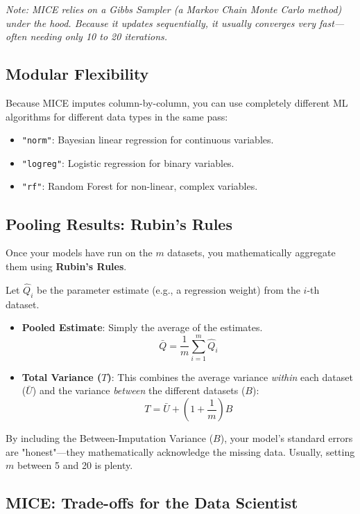 \documentclass[11pt]{article}
\theoremstyle{smallexample}
\begin{document}
\textit{Note: MICE relies on a Gibbs Sampler (a Markov Chain Monte Carlo method) under the hood. Because it updates sequentially, it usually converges very fast—often needing only 10 to 20 iterations.}

\subsection{Modular Flexibility}

Because MICE imputes column-by-column, you can use completely different ML algorithms for different data types in the same pass:
\begin{itemize}
    \item \texttt{"norm"}: Bayesian linear regression for continuous variables.
    \item \texttt{"logreg"}: Logistic regression for binary variables.
    \item \texttt{"rf"}: Random Forest for non-linear, complex variables.
\end{itemize}

\subsection{Pooling Results: Rubin's Rules}

Once your models have run on the $m$ datasets, you mathematically aggregate them using \textbf{Rubin's Rules}. 

Let $\hat{Q}_i$ be the parameter estimate (e.g., a regression weight) from the $i$-th dataset.
\begin{itemize}
    \item \textbf{Pooled Estimate}: Simply the average of the estimates.
    \[
        \bar{Q} = \frac{1}{m} \sum_{i=1}^{m} \hat{Q}_i
    \]
    \item \textbf{Total Variance ($T$)}: This combines the average variance \textit{within} each dataset ($\bar{U}$) and the variance \textit{between} the different datasets ($B$):
    \[
        T = \bar{U} + \left(1 + \frac{1}{m}\right) B
    \]
\end{itemize}
By including the Between-Imputation Variance ($B$), your model's standard errors are "honest"—they mathematically acknowledge the missing data. Usually, setting $m$ between 5 and 20 is plenty.

\subsection{MICE: Trade-offs for the Data Scientist}
\end{document}
